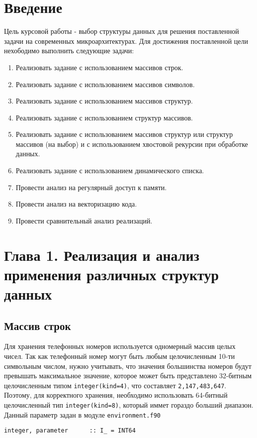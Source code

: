 \documentclass[a4paper,14pt]{article}
\begin{document}
\newpage

\section{Введение}
Цель курсовой работы - выбор структуры данных для решения поставленной задачи на современных микроархитектурах.{\newline}
Для достижения поставленной цели нехободимо выполнить следующие задачи:
\begin{enumerate}
    \item Реализовать задание с использованием массивов строк.
    \item Реализовать задание с использованием массивов символов.
    \item Реализовать задание с использованием массивов структур.
    \item Реализовать задание с использованием структур массивов.
    \item Реализовать задание с использованием массивов структур или структур массивов (на выбор) и с использованием хвостовой рекурсии при обработке данных.
    \item Реализовать задание с использованием динамического списка.
    \item Провести анализ на регулярный доступ к памяти.
    \item Провести анализ на векторизацию кода.
    \item Провести сравнительный анализ реализаций.
\end{enumerate}

\newpage

\section{Глава 1. Реализация и анализ применения различных структур данных}
\subsection{Массив строк}

Для хранения телефонных номеров используется одномерный массив целых чисел. Так как телефонный номер могут быть любым целочисленным 10-ти символьным числом, нужно учитывать, что значения большинства номеров будут превышать максимальное значение, которое может быть представлено 32-битным целочисленным типом \texttt{integer(kind=4)}, что составляет \texttt{2,147,483,647}. Поэтому, для корректного хранения, необходимо использовать 64-битный целочисленный тип \texttt{integer(kind=8)}, который иммет гораздо больший диапазон. Данный параметр задан в модуле \texttt{environment.f90}
\begin{lstlisting}[caption={Разновидность типа для целочисленных переменных}]
integer, parameter      :: I_ = INT64 
\end{lstlisting}
\end{document}
